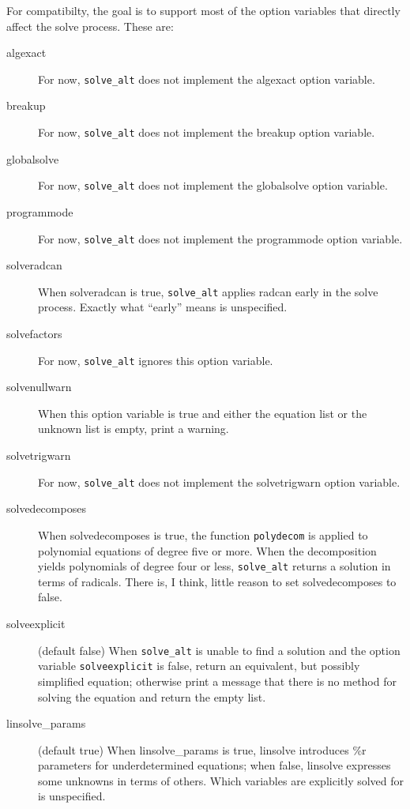 \documentclass[]{scrartcl}
\newcommand{\altsolve}{\texttt{solve\_alt}}
\newcommand{\solveexplicit}{\texttt{solveexplicit}}
\begin{document}
For compatibilty, the goal is to support most of the option variables that directly affect
the solve process. These are:
\begin{description}

\item [algexact] For now, \altsolve\/ does not implement the algexact option variable.

\item [breakup] For now, \altsolve\/ does not implement the breakup option variable.

\item [globalsolve] For now, \altsolve\/ does not implement the globalsolve option variable.

\item [programmode] For now, \altsolve\/ does not implement the programmode option variable.

\item [solveradcan] When solveradcan is true, \altsolve\/ applies radcan early in the solve process.
      Exactly what ``early'' means is unspecified.

\item [solvefactors] For now, \altsolve\/ ignores this option variable.

\item [solvenullwarn] When this option variable is true and either the equation list or the unknown list is
empty, print a warning.

\item [solvetrigwarn] For now, \altsolve\/ does not implement the solvetrigwarn option variable.

\item [solvedecomposes] When solvedecomposes is true, the function \texttt{polydecom} is applied to
polynomial equations of degree five or more. When the decomposition yields polynomials of degree four
or less, \altsolve\/ returns a solution in terms of radicals. There is, I think, little reason to
set solvedecomposes to false.

\item [solveexplicit] (default false) When \altsolve\/  is unable to find a solution and the option
variable \solveexplicit\/ is false, return an equivalent, but possibly simplified equation;
otherwise print a message that there is no method for solving the equation and return the empty list.

\item [linsolve\_params] (default true) When linsolve\_params is true, linsolve introduces \%r
parameters for underdetermined equations; when false, linsolve expresses some unknowns in terms
of others. Which variables are explicitly solved for is unspecified.


\end{description}
\end{document}
